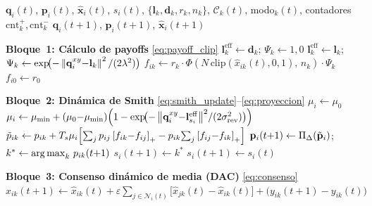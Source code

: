 \begin{algorithm}[htbp]
\caption{Bucle de control distribuido, robot $i$, instante $t$}
\label{alg:loop}
\footnotesize
\setlength{\baselineskip}{0.95\baselineskip}
\begin{algorithmic}[1]
\Require $\mathbf{q}_i(t)$, $\mathbf{p}_i(t)$, $\hat{\mathbf{x}}_i(t)$,
         $s_i(t)$, $\{\mathbf{l}_k, \mathbf{d}_k, r_k, n_k\}$,
         $\mathcal{C}_k(t)$, modo$_k(t)$, contadores $\mathrm{cnt}^{+}_k, \mathrm{cnt}^{-}_k$
\Ensure $\mathbf{q}_i(t{+}1)$, $\mathbf{p}_i(t{+}1)$, $\hat{\mathbf{x}}_i(t{+}1)$

\State \textbf{Bloque~1: Cálculo de payoffs} \eqref{eq:payoff_clip}
    \State $\mathbf{l}^{\mathrm{eff}}_k \gets \mathbf{d}_k$;\enspace
           $\Psi_k \gets 1{,}0$
  \Else
    \State $\mathbf{l}^{\mathrm{eff}}_k \gets \mathbf{l}_k$;\enspace
           $\Psi_k \gets \exp\!\bigl(-\left\|\mathbf{q}_i^{xy}{-}\mathbf{l}_k\right\|^2/(2\lambda^2)\bigr)$
  \EndIf
  \State $f_{ik} \gets r_k \cdot \Phi\!\left(N\,\mathrm{clip}(\hat{x}_{ik}(t),0,1),\,n_k\right)\cdot\Psi_k$
\EndFor
\State $f_{i0} \gets r_0$

\State \textbf{Bloque~2: Dinámica de Smith} \eqref{eq:smith_update}--\eqref{eq:proyeccion}
 
  \State $\mu_i \gets \mu_0$
\Else
  \State $\mu_i \gets \mu_{\min} + (\mu_0{-}\mu_{\min})\!\left(1 - \exp\!\bigl(-\left\|\mathbf{q}_i^{xy}{-}\mathbf{l}^{\mathrm{eff}}_{s_i}\right\|^2\!/(2\sigma_{\mathrm{rev}}^2)\bigr)\right)$
\EndIf
{}
  \State $\tilde{p}_{ik} \gets p_{ik} + T_s\mu_i\!\left[
    \sum_{j}p_{ij}\left[f_{ik}{-}f_{ij}\right]_{+}
    - p_{ik}\!\sum_{j}\left[f_{ij}{-}f_{ik}\right]_{+}\right]$
\EndFor
\State $\mathbf{p}_i(t{+}1) \gets \Pi_{\Delta}(\tilde{\mathbf{p}}_i)$;\enspace
       $k^* \gets \operatorname*{arg\,max}_k\, p_{ik}(t{+}1)$
  \State $s_i(t{+}1) \gets k^*$ 
\Else
  \State $s_i(t{+}1) \gets s_i(t)$ 
\EndIf

\State \textbf{Bloque~3: Consenso dinámico de media (DAC)} \eqref{eq:consenso}
  \State $\hat{x}_{ik}(t{+}1) \gets \hat{x}_{ik}(t)
    + \varepsilon\!\sum_{j\in\mathcal{N}_i(t)}\!\bigl[\hat{x}_{jk}(t) - \hat{x}_{ik}(t)\bigr]
    + \bigl(y_{ik}(t{+}1) - y_{ik}(t)\bigr)$
\EndFor


\end{algorithmic}
\end{algorithm}
